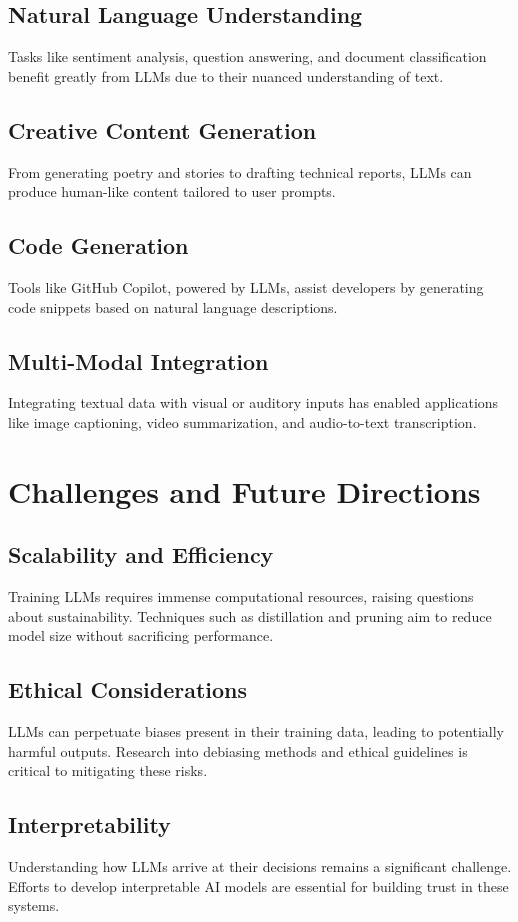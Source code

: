 \documentclass[12pt]{article}
\begin{document}
\subsection{Natural Language Understanding}
Tasks like sentiment analysis, question answering, and document classification benefit greatly from LLMs due to their nuanced understanding of text.

\subsection{Creative Content Generation}
From generating poetry and stories to drafting technical reports, LLMs can produce human-like content tailored to user prompts.

\subsection{Code Generation}
Tools like GitHub Copilot, powered by LLMs, assist developers by generating code snippets based on natural language descriptions.

\subsection{Multi-Modal Integration}
Integrating textual data with visual or auditory inputs has enabled applications like image captioning, video summarization, and audio-to-text transcription.

\section{Challenges and Future Directions}
\subsection{Scalability and Efficiency}
Training LLMs requires immense computational resources, raising questions about sustainability. Techniques such as distillation and pruning aim to reduce model size without sacrificing performance.

\subsection{Ethical Considerations}
LLMs can perpetuate biases present in their training data, leading to potentially harmful outputs. Research into debiasing methods and ethical guidelines is critical to mitigating these risks.

\subsection{Interpretability}
Understanding how LLMs arrive at their decisions remains a significant challenge. Efforts to develop interpretable AI models are essential for building trust in these systems.
\end{document}
